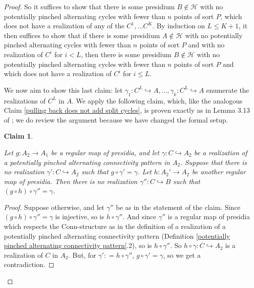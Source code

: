 \documentclass{amsart}
\newtheorem{claim}[theorem]{Claim}
\theoremstyle{definition}
\theoremstyle{remark}
\numberwithin{equation}{section}
\begin{document}
\begin{proof}
     So it suffices to show that there is some presidium $B \notin \mathcal{H}$ with no potentially pinched alternating cycles with fewer than $n$ points of sort $P$, which does not have a realization of any of the  $C^{1}, \ldots C^{K}$. By induction on $L \leq K+1$, it then suffices to show that if there is some presidium $A \notin \mathcal{H}$ with no potentially pinched alternating cycles with fewer than $n$ points of sort $P$ and with no realization of $C^{i}$ for $i < L$, then there is some presidium $B \notin \mathcal{H}$ with no potentially pinched alternating cycles with fewer than $n$ points of sort $P$ and which does not have a realization of $C^{i}$ for $i \leq L$.


      We now aim to show this last claim: let $\gamma_{1}: C^{L} \hookrightarrow A, \ldots, \gamma_{k} :{C}^{L} \hookrightarrow A$ enumerate the realizations of $C^{L}$ in $A$. We  apply the following claim, which, like the analogous Claim \ref{pulling back does not add split cycles}, is proven exactly as in Lemma 3.13 of \cite{ApproxOrder}; we do review the argument because we have changed the formal setup. 

      
\begin{claim}
\label{pulling back does not create new realizations of a potentially pinched alternating connectivity pattern}

Let $g: A_{2} \to A_{1}$ be a regular map of presidia, and let $\gamma: C \hookrightarrow A_{2}$ be a realization of a potentially pinched alternating connectivity pattern in $A_{2}$. Suppose that there is no realization $\gamma': C \hookrightarrow A_{2}$  such that $g \circ \gamma' = \gamma$. Let $h: A_{2}' \to A_{2}$ be another regular map of presidia. Then there is no realization $\gamma'': C \hookrightarrow B$ such that $(g \circ h) \circ \gamma'' = \gamma$.



\end{claim}

\begin{proof}
    Suppose otherwise, and let $\gamma''$ be as in the statement of the claim. Since $(g \circ h) \circ \gamma''= \gamma$ is injective, so is $h \circ \gamma''$.  And since $\gamma''$ is a regular map of presidia which respects the $\mathrm{Conn}$-structure as in the definition of a realization of a potentially pinched alternating connectivity pattern (Definition \ref{potentially pinched alternating connectivity pattern}.2), so is $h \circ \gamma''$. So $h \circ \gamma: C \hookrightarrow A_{2}$ is a realization of $C$ in $A_{2}$. But, for $\gamma' : = h \circ \gamma''$, $g \circ \gamma' = \gamma$, so we get a contradiction. 
\end{proof}


\end{proof}
\end{document}
